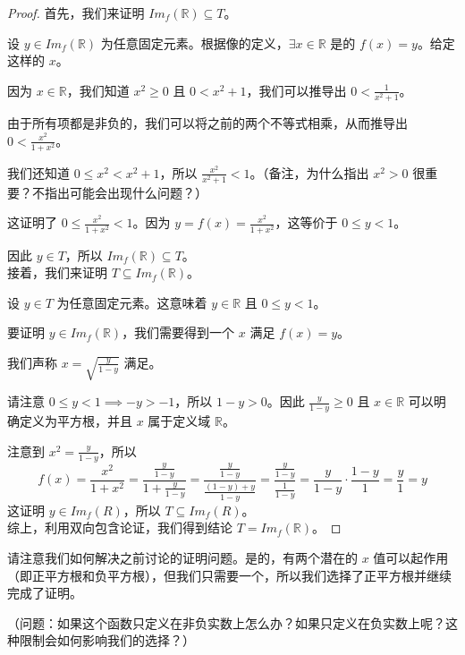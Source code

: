 \begin{example}
    \begin{proof}
        首先，我们来证明 $Im_f (\mathbb{R}) \subseteq T$。

        设 $y \in Im_f (\mathbb{R})$ 为任意固定元素。根据像的定义，$\exists x \in \mathbb{R}$ 是的 $f(x) = y$。给定这样的 $x$。

        因为 $x \in \mathbb{R}$，我们知道 $x^2 \ge 0$ 且 $0 < x^2+1$，我们可以推导出 $0 < \frac{1}{x^2+1}$。

        由于所有项都是非负的，我们可以将之前的两个不等式相乘，从而推导出 $0 < \frac{x^2}{1+x^2}$。

        我们还知道 $0 \le x^2 < x^2 + 1$，所以 $\frac{x^2}{x^2+1}<1$。（备注，为什么指出 $x^2>0$ 很重要？不指出可能会出现什么问题？）

        这证明了 $0 \le \frac{x^2}{1+x^2} < 1$。因为 $y = f(x) = \frac{x^2}{1+x^2}$，这等价于 $0 \le y < 1$。

        因此 $y \in T$，所以 $Im_f (\mathbb{R}) \subseteq T$。\\

        接着，我们来证明 $T \subseteq Im_f (\mathbb{R})$。

        设 $y \in T$ 为任意固定元素。这意味着 $y \in \mathbb{R}$ 且 $0 \le y < 1$。

        要证明 $y \in Im_f (\mathbb{R})$，我们需要得到一个 $x$ 满足 $f(x) = y$。

        我们声称 $x = \sqrt{\frac{y}{1-y}}$ 满足。

        请注意 $0 \le y < 1 \implies -y > -1$，所以 $1-y > 0$。因此 $\frac{y}{1-y} \ge 0$ 且 $x \in \mathbb{R}$ 可以明确定义为平方根，并且 $x$ 属于定义域 $\mathbb{R}$。
        
        注意到 $x^2=\frac{y}{1-y}$，所以
        \[f(x) = \frac{x^2}{1+x^2} = \frac{\frac{y}{1-y}}{1+\frac{y}{1-y}}=\frac{\frac{y}{1-y}}{\frac{(1-y)+y}{1-y}}=\frac{\frac{y}{1-y}}{\frac{1}{1-y}}=\frac{y}{1-y} \cdot \frac{1-y}{1} = \frac{y}{1} = y\]
        这证明 $y \in Im_f (R)$，所以 $T \subseteq Im_f (R)$。\\

        综上，利用双向包含论证，我们得到结论 $T = Im_f (\mathbb{R})$。
    \end{proof}
\end{example}

请注意我们如何解决之前讨论的证明问题。是的，有两个潜在的 $x$ 值可以起作用（即正平方根和负平方根），但我们只需要一个，所以我们选择了正平方根并继续完成了证明。

（问题：如果这个函数只定义在非负实数上怎么办？如果只定义在负实数上呢？这种限制会如何影响我们的选择？）\\

